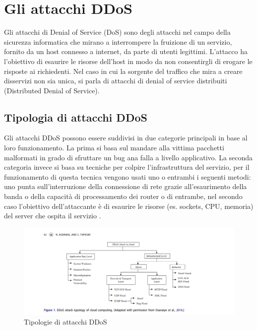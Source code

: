\section{Gli attacchi DDoS}

Gli attacchi di Denial of Service (DoS) sono degli attacchi nel campo della sicurezza informatica che mirano a interrompere la fruizione di un servizio, fornito da un host connesso a internet, da parte di utenti legittimi. L'attacco ha l'obiettivo di esaurire le risorse dell'host in modo da non consentirgli di erogare le risposte ai richiedenti.
Nel caso in cui la sorgente del traffico che mira a creare disservizi non sia unica, si parla di attacchi di denial of service distribuiti (Distributed Denial of Service).

\subsection{Tipologia di attacchi DDoS}
    
Gli attacchi DDoS possono essere suddivisi in due categorie principali in base al loro funzionamento. La prima si basa sul mandare alla vittima pacchetti malformati in grado di sfruttare un bug ana falla a livello applicativo. La seconda categoria invece si basa su tecniche per colpire l'infrastruttura del servizio, per il funzionamento di questa tecnica vengono usati uno o entrambi i seguenti metodi: uno punta sull'interruzione della connessione di rete grazie all'esaurimento della banda o della capacità di processamento dei router o di entrambe, nel secondo caso l'obiettivo dell'attaccante è di esaurire le risorse (es. sockets, CPU, memoria) del server che ospita il servizio \cite{ddos_survey_1}.

\begin{figure}[h]
    \includegraphics[width=\hsize]{images/introduzione/tipologie_ddos.png}
    \caption{Tipologie di attacchi DDoS \cite{ddos_survey_3}}
    \centering
\end{figure}

